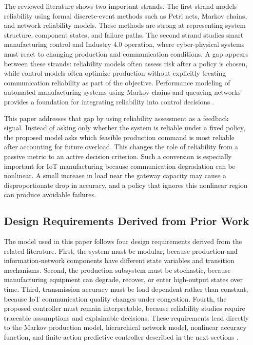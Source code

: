 \documentclass[journal]{IEEEtran}
\begin{document}
The reviewed literature shows two important strands. The first strand models reliability using formal discrete-event methods such as Petri nets, Markov chains, and network reliability models. These methods are strong at representing system structure, component states, and failure paths. The second strand studies smart manufacturing control and Industry 4.0 operation, where cyber-physical systems must react to changing production and communication conditions. A gap appears between these strands: reliability models often assess risk after a policy is chosen, while control models often optimize production without explicitly treating communication reliability as part of the objective. Performance modeling of automated manufacturing systems using Markov chains and queueing networks provides a foundation for integrating reliability into control decisions \cite{viswanadham1992performance}.

This paper addresses that gap by using reliability assessment as a feedback signal. Instead of asking only whether the system is reliable under a fixed policy, the proposed model asks which feasible production command is most reliable after accounting for future overload. This changes the role of reliability from a passive metric to an active decision criterion. Such a conversion is especially important for IoT manufacturing because communication degradation can be nonlinear. A small increase in load near the gateway capacity may cause a disproportionate drop in accuracy, and a policy that ignores this nonlinear region can produce avoidable failures.

\subsection{Design Requirements Derived from Prior Work}

The model used in this paper follows four design requirements derived from the related literature. First, the system must be modular, because production and information-network components have different state variables and transition mechanisms. Second, the production subsystem must be stochastic, because manufacturing equipment can degrade, recover, or enter high-output states over time. Third, transmission accuracy must be load dependent rather than constant, because IoT communication quality changes under congestion. Fourth, the proposed controller must remain interpretable, because reliability studies require traceable assumptions and explainable decisions. These requirements lead directly to the Markov production model, hierarchical network model, nonlinear accuracy function, and finite-action predictive controller described in the next sections \cite{viswanadham1992performance}.
\end{document}
